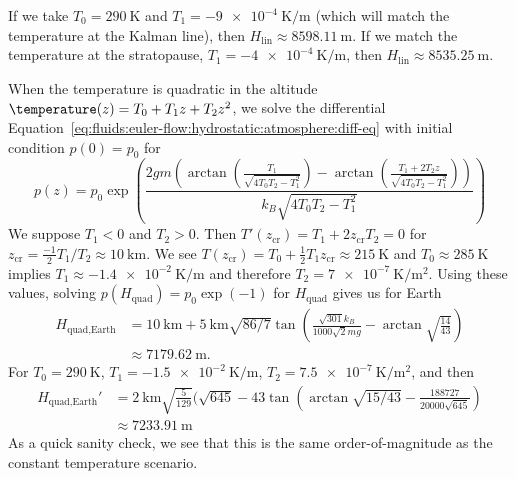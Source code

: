 \begin{node}[Hydrostatics]
\begin{node}[Atmosphere]
\begin{node}
If we take $T_{0}=\qty{290}{\kelvin}$ and
$T_{1}=\qty{-9e-4}{\kelvin\per\meter}$ (which will match the temperature
at the Kalman line),
then $H_{\text{lin}}\approx\qty{8598.11}{\meter}$.
If we match the temperature at the stratopause,
$T_{1}=\qty{-4e-4}{\kelvin\per\meter}$,
then $H_{\text{lin}}\approx\qty{8535.25}{\meter}$. 
\end{node}

\begin{node}\label{fluids:euler-flow-000C}%
When the temperature is quadratic in the altitude $\temperature(z)=T_{0}+T_{1}z+T_{2}z^{2}$,
we solve the differential Equation~\eqref{eq:fluids:euler-flow:hydrostatic:atmosphere:diff-eq}
with initial condition $p(0)=p_{0}$ for
\begin{equation}
p(z) = p_{0}\exp \left(\frac{2 g m \left(\arctan\left(\frac{T_{1}}{\sqrt{4
    T_{0} T_{2}-T_{1}^{2}}}\right)-\arctan\left(\frac{T_{1}+2 T_{2} z}{\sqrt{4 T_{0}
    T_{2}-T_{1}^{2}}}\right)\right)}{k_{B} \sqrt{4 T_{0} T_{2}-T_{1}^{2}}}\right)
\end{equation}
We suppose $T_{1}<0$ and $T_{2}>0$. Then $T'(z_{\text{cr}})=T_{1}+2z_{\text{cr}}T_{2}=0$ for $z_{\text{cr}}=\frac{-1}{2}T_{1}/T_{2}\approx\qty{10}{\kilo\meter}$.
We see $T(z_{\text{cr}})=T_{0}+\frac{1}{2}T_{1}z_{\text{cr}}\approx\qty{215}{\kelvin}$
and $T_{0}\approx\qty{285}{\kelvin}$ implies $T_{1}\approx\qty{-1.4e-2}{\kelvin\per\meter}$
and therefore $T_{2}=\qty{7e-7}{\kelvin\per\meter\squared}$. Using these
values, solving $p(H_{\text{quad}})=p_{0}\exp(-1)$ for $H_{\text{quad}}$
gives us for Earth
\begin{equation}
  \begin{split}
H_{\text{quad},\text{Earth}}&=\qty{10}{\kilo\meter}+\qty{5}{\kilo\meter}\sqrt{86/7}\tan\left(\frac{\sqrt{301}k_{B}}{1000\sqrt{2}mg}-\arctan\sqrt{\frac{14}{43}}\right)\\
&\approx\qty{7179.62}{\meter}.
  \end{split}
\end{equation}
For $T_{0}=\qty{290}{\kelvin}$, $T_{1}=\qty{-1.5e-2}{\kelvin\per\meter}$,
$T_{2}=\qty{7.5e-7}{\kelvin\per\meter\squared}$,
and then 
\begin{equation}
\begin{split}
H_{\text{quad},\text{Earth}}'&= \qty{2}{\kilo\meter}\sqrt{\frac{5}{129}}(\sqrt{645}-43\tan\left(\arctan\sqrt{15/43}-\frac{188727}{20000\sqrt{645}}\right)\\
&\approx\qty{7233.91}{\meter}
\end{split}
\end{equation}
As a quick sanity check, we see that this is the same order-of-magnitude
as the constant temperature scenario.
\end{node}
\end{node}


\end{node}
